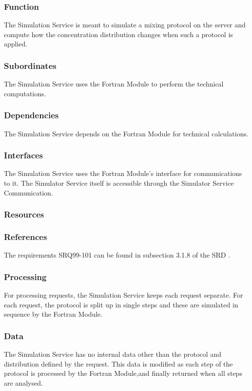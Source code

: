 \subsubsection*{Function}
The Simulation Service is meant to simulate a mixing protocol on the server and compute how the concentration distribution changes when such a protocol is applied.

\subsubsection*{Subordinates}
The Simulation Service uses the Fortran Module to perform the technical computations.

\subsubsection*{Dependencies}
The Simulation Service depends on the Fortran Module for technical calculations.

\subsubsection*{Interfaces}
The Simulation Service uses the Fortran Module's interface for communications to it. The Simulator Service itself is accessible through the Simulator Service Communication.

\subsubsection*{Resources}

\subsubsection*{References}
The requirements SRQ99-101 can be found in subsection 3.1.8 of the SRD \cite{srd}.

\subsubsection*{Processing}
For processing requests, the Simulation Service keeps each request separate. For each request, the protocol is split up in single steps and these are simulated in sequence by the Fortran Module.

\subsubsection*{Data}
The Simulation Service has no internal data other than the protocol and distribution defined by the request. This data is modified as each step of the protocol is processed by the Fortran Module,and finally returned when all steps are analysed.


